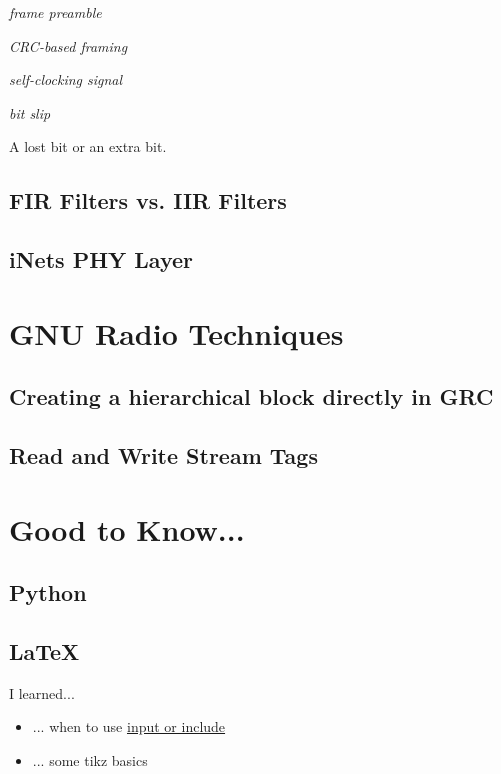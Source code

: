 \documentclass{article}
\begin{document}
\emph{frame preamble}

\bigskip

\emph{CRC-based framing}

\bigskip

\emph{self-clocking signal}

\bigskip

\emph{bit slip}

A lost bit or an extra bit.

\subsection{FIR Filters vs. IIR Filters} 

\subsection{iNets PHY Layer}

\section{GNU Radio Techniques}

\subsection{Creating a hierarchical block directly in GRC}

\subsection{Read and Write Stream Tags}

\section{Good to Know...}

\subsection{Python}

\subsection{\LaTeX}

I learned...

\begin{itemize}
	\item ... when to use \href{https://tex.stackexchange.com/questions/246/when-should-i-use-input-vs-include}{input or include}
	\item ... some tikz basics
\end{itemize}
\end{document}
